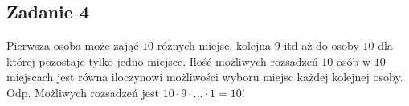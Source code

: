 \subsection{Zadanie 4}

Pierwsza osoba może zająć $10$ różnych miejsc, kolejna $9$ itd aż do osoby $10$ dla której pozostaje tylko jedno miejsce. Ilość możliwych rozsadzeń $10$ osób w $10$ miejscach jest równa iloczynowi możliwości wyboru miejsc każdej kolejnej osoby.
\\
Odp. Możliwych rozsadzeń jest $10 \cdot 9 \cdot . . . \cdot 1 = 10!$

